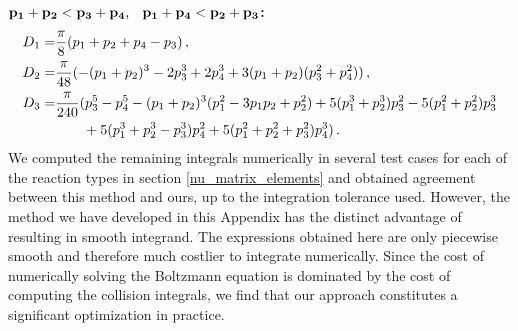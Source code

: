 ${\bf p_1+p_2<p_3+p_4\text{, \hspace{1mm} }p_1+p_4<p_2+p_3}${\bf :}
\begin{align}
D_1=&\frac{\pi}{8}(p_1+p_2+p_4-p_3)\,,\\
D_2=&\frac{\pi}{48}(-(p_1+p_2)^3-2p_3^3+2p_4^3+3(p_1+p_2)(p_3^2+p_4^2))\,,\notag\\
D_3=&\frac{\pi}{240}(p_3^5-p_4^5-(p_1+p_2)^3(p_1^2-3p_1p_2+p_2^2)+5(p_1^3+p_2^3)p_3^2-5(p_1^2+p_2^2)p_3^3\notag\\
&\hspace{7mm}+5(p_1^3+p_2^3-p_3^3)p_4^2+5(p_1^2+p_2^2+p_3^2)p_4^3)\,.\notag
\end{align}
We computed the remaining integrals numerically in several test cases for each of the reaction types in section \ref{nu_matrix_elements} and obtained agreement between this method and ours, up to the integration tolerance used.  However, the method we have developed in this Appendix has the distinct advantage of resulting in  smooth integrand.  The expressions obtained here are only piecewise smooth and therefore much costlier to integrate numerically.  Since the cost of numerically solving the Boltzmann equation is dominated by the cost of computing the collision integrals, we find that our approach constitutes a  significant optimization in practice.



